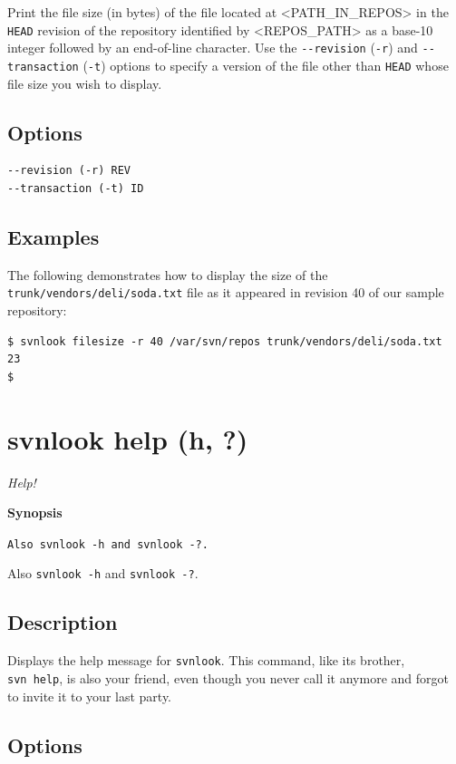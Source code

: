 Print the file size (in bytes) of the file located at
\textless PATH\_IN\_REPOS\textgreater{} in the \texttt{HEAD} revision of
the repository identified by \textless REPOS\_PATH\textgreater{} as a
base-10 integer followed by an end-of-line character. Use the
\texttt{-\/-revision} (\texttt{-r}) and \texttt{-\/-transaction}
(\texttt{-t}) options to specify a version of the file other than
\texttt{HEAD} whose file size you wish to display.

\subsection{Options}

\begin{verbatim}
--revision (-r) REV
--transaction (-t) ID
\end{verbatim}

\subsection{Examples}

The following demonstrates how to display the size of the
\texttt{trunk/vendors/deli/soda.txt} file as it appeared in revision 40
of our sample repository:

\begin{verbatim}
$ svnlook filesize -r 40 /var/svn/repos trunk/vendors/deli/soda.txt
23
$
\end{verbatim}

\section{svnlook help (h, ?)}\label{svn.ref.svnlook.c.help}

\emph{Help!}

\textbf{Synopsis}

\texttt{Also\ svnlook\ -h\ and\ svnlook\ -?.}

Also \texttt{svnlook\ -h} and \texttt{svnlook\ -?}.

\subsection{Description}

Displays the help message for \texttt{svnlook}. This command, like its
brother, \texttt{svn\ help}, is also your friend, even though you never
call it anymore and forgot to invite it to your last party.

\subsection{Options}


